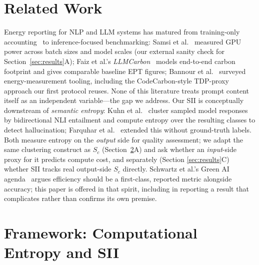 \documentclass[conference]{IEEEtran}
\begin{document}
\section{Related Work}
Energy reporting for NLP and LLM systems has matured from
training-only accounting~\cite{strubell2019energy,patterson2022carbon}
to inference-focused benchmarking: Samsi et
al.~\cite{samsi2023words} measured GPU power across batch sizes and
model scales (our external sanity check for Section~\ref{sec:results}A);
Faiz et al.'s \emph{LLMCarbon}~\cite{faiz2024llmcarbon} models
end-to-end carbon footprint and gives comparable baseline EPT figures;
Bannour et al.~\cite{bannour2021evaluating} surveyed energy-measurement
tooling, including the CodeCarbon-style TDP-proxy approach our first
protocol reuses. None of this literature treats prompt content itself
as an independent variable---the gap we address.
Our SII is conceptually downstream of \emph{semantic entropy}: Kuhn et
al.~\cite{kuhn2023semantic} cluster sampled model responses by
bidirectional NLI entailment and compute entropy over the resulting
classes to detect hallucination; Farquhar et
al.~\cite{farquhar2024detecting} extended this without ground-truth
labels. Both measure entropy on the \emph{output} side for quality
assessment; we adapt the same clustering construct as $S_c$
(Section~\ref{sec:framework}A) and ask whether an \emph{input}-side
proxy for it predicts compute cost, and separately (Section
\ref{sec:results}C) whether SII tracks real output-side $S_c$ directly.
Schwartz et al.'s Green AI agenda~\cite{schwartz2020green} argues
efficiency should be a first-class, reported metric alongside
accuracy; this paper is offered in that spirit, including in reporting
a result that complicates rather than confirms its own premise.
\section{Framework: Computational Entropy and SII}
\label{sec:framework}
\end{document}
